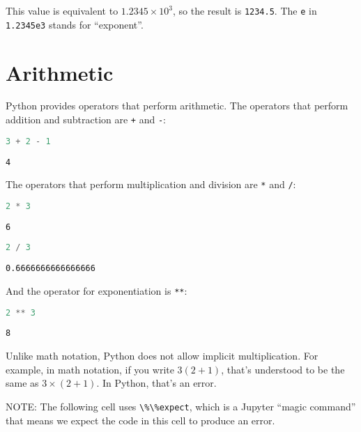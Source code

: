 \documentclass[
]{book}
\newcommand{\passthrough}[1]{#1}
\begin{document}
This value is equivalent to \(1.2345 \times 10^{3}\), so the result is
\passthrough{\lstinline!1234.5!}. The \passthrough{\lstinline!e!} in
\passthrough{\lstinline!1.2345e3!} stands for ``exponent''.

\section{Arithmetic}\label{arithmetic}

Python provides operators that perform arithmetic. The operators that
perform addition and subtraction are \passthrough{\lstinline!+!} and
\passthrough{\lstinline!-!}:

\begin{lstlisting}[language=Python]
3 + 2 - 1
\end{lstlisting}

\begin{lstlisting}
4
\end{lstlisting}

The operators that perform multiplication and division are
\passthrough{\lstinline!*!} and \passthrough{\lstinline!/!}:

\begin{lstlisting}[language=Python]
2 * 3
\end{lstlisting}

\begin{lstlisting}
6
\end{lstlisting}

\begin{lstlisting}[language=Python]
2 / 3
\end{lstlisting}

\begin{lstlisting}
0.6666666666666666
\end{lstlisting}

And the operator for exponentiation is \passthrough{\lstinline!**!}:

\begin{lstlisting}[language=Python]
2 ** 3
\end{lstlisting}

\begin{lstlisting}
8
\end{lstlisting}

Unlike math notation, Python does not allow implicit multiplication. For
example, in math notation, if you write \(3 (2 + 1)\), that's understood
to be the same as \(3 \times (2+ 1)\). In Python, that's an error.

NOTE: The following cell uses \passthrough{\lstinline!\%\%expect!},
which is a Jupyter ``magic command'' that means we expect the code in
this cell to produce an error.
\end{document}

